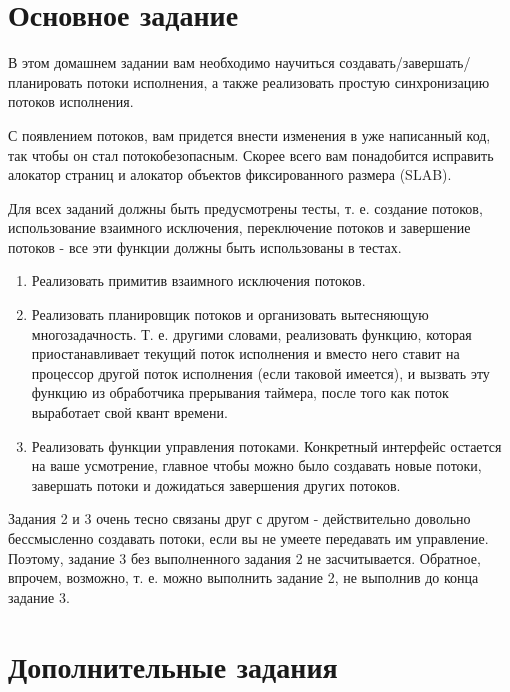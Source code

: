 \section{Основное задание}

В этом домашнем задании вам необходимо научиться создавать/завершать/планировать
потоки исполнения, а также реализовать простую синхронизацию потоков исполнения.

С появлением потоков, вам придется внести изменения в уже написанный код, так
чтобы он стал потокобезопасным. Скорее всего вам понадобится исправить алокатор
страниц и алокатор объектов фиксированного размера (SLAB).

Для всех заданий должны быть предусмотрены тесты, т. е. создание потоков,
использование взаимного исключения, переключение потоков и завершение потоков -
все эти функции должны быть использованы в тестах.

\begin{enumerate}
  \item Реализовать примитив взаимного исключения потоков.
  \item Реализовать планировщик потоков и организовать вытесняющую
        многозадачность. Т. е. другими словами, реализовать функцию, которая
        приостанавливает текущий поток исполнения и вместо него ставит на
        процессор другой поток исполнения (если таковой имеется), и вызвать эту
        функцию из обработчика прерывания таймера, после того как поток
        выработает свой квант времени.
  \item Реализовать функции управления потоками. Конкретный интерфейс остается
        на ваше усмотрение, главное чтобы можно было создавать новые потоки,
        завершать потоки и дожидаться завершения других потоков.
\end{enumerate}

Задания 2 и 3 очень тесно связаны друг с другом - действительно довольно
бессмысленно создавать потоки, если вы не умеете передавать им управление.
Поэтому, задание 3 без выполненного задания 2 не засчитывается. Обратное,
впрочем, возможно, т. е. можно выполнить задание 2, не выполнив до конца
задание 3.

\section{Дополнительные задания}

